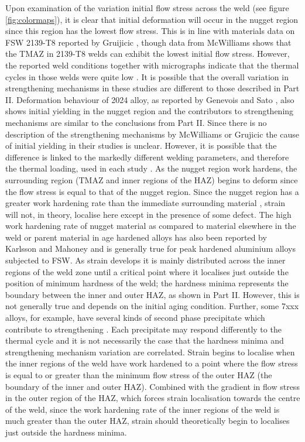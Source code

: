 Upon examination of the variation initial flow stress across the weld (see figure \ref{fig:colormaps}), it is clear that initial deformation will occur in the nugget region since this region has the lowest flow stress. 
This is in line with materials data on FSW 2139-T8 reported by Gruijicic \cite{Grujicic2011a}, though data from McWilliams \cite{McWilliams2013} shows that the TMAZ in 2139-T8 welds can exhibit the lowest initial flow stress. However, the reported weld conditions together with micrographs indicate that the thermal cycles in those welds were quite low \cite{Mishra2005}. It is possible that the overall variation in strengthening mechanisms in these studies are different to those described in Part II. Deformation behaviour of 2024 alloy, as reported by Genevois \cite{Genevois2006} and Sato \cite{Sato1999,Sato2001,Sato2001b}, also shows initial yielding in the nugget region and the contributors to strengthening mechanisms are similar to the conclusions from Part II. Since there is no description of the strengthening mechanisms by McWilliams or Grujicic the cause of initial yielding in their studies is unclear. However, it is possible that the difference is linked to the markedly different welding parameters, and therefore the thermal loading, used in each study \cite{Mishra2005}.
As the nugget region work hardens, the surrounding region (TMAZ and inner regions of the HAZ) begins to deform since the flow stress is equal to that of the nugget region. Since the nugget region has a greater work hardening rate than the immediate surrounding material \cite{Grujicic2011a,Genevois2006}, strain will not, in theory, localise here except in the presence of some defect. 
The high work hardening rate of nugget material as compared to material elsewhere in the weld or parent material in age hardened alloys has also been reported by Karlsson \cite{Karlsson2000} and Mahoney \cite{Mahoney1998} and is generally true for peak hardened aluminium alloys subjected to FSW.
As strain develops it is mainly distributed across the inner regions of the weld zone until a critical point where it localises just outside the position of minimum hardness of the weld; the hardness minima represents the boundary between the inner and outer HAZ, as shown in Part II. However, this is not generally true and depends on the initial aging condition. Further, some 7xxx alloys, for example, have several kinds of second phase precipitate which contribute to strengthening \cite{Sullivan2011}. Each precipitate may respond differently to the thermal cycle and it is not necessarily the case that the hardness minima and strengthening mechanism variation are correlated. Strain begins to localise when the inner regions of the weld have work hardened to a point where the flow stress is equal to or greater than the minimum flow stress of the outer HAZ (the boundary of the inner and outer HAZ). Combined with the gradient in flow stress in the outer region of the HAZ, which forces strain localisation towards the centre of the weld, since the work hardening rate of the inner regions of the weld is much greater than the outer HAZ, strain should theoretically begin to localises just outside the hardness minima. 


